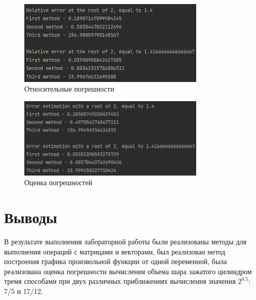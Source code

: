 \documentclass[a4paper, 14pt]{extarticle}
\begin{document}
\begin{figure}[!htb]
	\centering
	\includegraphics[width=0.8\textwidth]{img2}
\caption{Относительные погрешности}
\label{fig:img2}
\end{figure}

\begin{figure}[!htb]
	\centering
	\includegraphics[width=0.8\textwidth]{img3}
\caption{Оценка погрешностей}
\label{fig:img3}
\end{figure}

\section{Выводы}\label{Sect::conclusion}

В результате выполнения лабораторной работы были реализованы методы для выполнения операций с матрицами и векторами, был реализован метод построения графика произвольной функции от одной переменной, была реализована оценка погрешности вычисления объема шара зажатого цилиндром тремя способами при двух различных приближениях вычисления значения $2^{0.5}$: 7/5 и 17/12.
\end{document}
